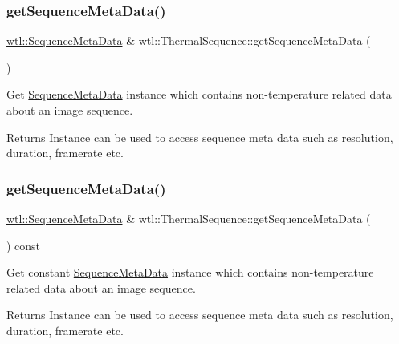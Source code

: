 \subsubsection{\texorpdfstring{get\+Sequence\+Meta\+Data()}{getSequenceMetaData()}\hspace{0.1cm}{\footnotesize\ttfamily [1/2]}}
{\footnotesize\ttfamily \hyperlink{classwtl_1_1_sequence_meta_data}{wtl\+::\+Sequence\+Meta\+Data} \& wtl\+::\+Thermal\+Sequence\+::get\+Sequence\+Meta\+Data (\begin{DoxyParamCaption}{ }\end{DoxyParamCaption})}



Get \hyperlink{classwtl_1_1_sequence_meta_data}{Sequence\+Meta\+Data} instance which contains non-\/temperature related data about an image sequence. 

\begin{DoxyReturn}{Returns}
Instance can be used to access sequence meta data such as resolution, duration, framerate etc. 
\end{DoxyReturn}
\mbox{\label{classwtl_1_1_thermal_sequence_a04999d96848ef73cc7b9de708f025fa2}} 
\subsubsection{\texorpdfstring{get\+Sequence\+Meta\+Data()}{getSequenceMetaData()}\hspace{0.1cm}{\footnotesize\ttfamily [2/2]}}
{\footnotesize\ttfamily \hyperlink{classwtl_1_1_sequence_meta_data}{wtl\+::\+Sequence\+Meta\+Data} \& wtl\+::\+Thermal\+Sequence\+::get\+Sequence\+Meta\+Data (\begin{DoxyParamCaption}{ }\end{DoxyParamCaption}) const}



Get constant \hyperlink{classwtl_1_1_sequence_meta_data}{Sequence\+Meta\+Data} instance which contains non-\/temperature related data about an image sequence. 

\begin{DoxyReturn}{Returns}
Instance can be used to access sequence meta data such as resolution, duration, framerate etc. 
\end{DoxyReturn}
\mbox{\label{classwtl_1_1_thermal_sequence_a7d3fb395f892aa2c040c889d2c4dc4ce}} 
